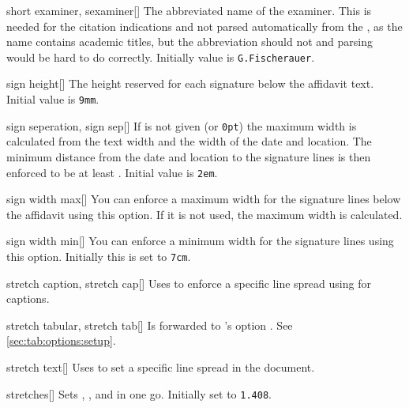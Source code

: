 \begin{describeopt}{short examiner, sexaminer}[]
  The abbreviated name of the examiner. This is needed for the citation
  indications and not parsed automatically from the , as the name
  contains academic titles, but the abbreviation should not and parsing would be
  hard to do correctly. Initially value is \texttt{G.\@ Fischerauer}.
\end{describeopt}
\begin{describeopt}{sign height}[]
  The height reserved for each signature below the affidavit text. Initial value
  is \texttt{9mm}.
\end{describeopt}
\begin{describeopt}{sign seperation, sign sep}[]
  If  is not given (or \texttt{0pt}) the maximum width is
  calculated from the text width and the width of the date and location. The
  minimum distance from the date and location to the signature lines is then
  enforced to be at least . Initial value is \texttt{2em}.
\end{describeopt}
\begin{describeopt}{sign width max}[]
  You can enforce a maximum width for the signature lines below the affidavit
  using this option. If it is not used, the maximum width is calculated.
\end{describeopt}
\begin{describeopt}{sign width min}[]
  You can enforce a minimum width for the signature lines using this option.
  Initially this is set to \texttt{7cm}.
\end{describeopt}
\begin{describeopt}{stretch caption, stretch cap}[]
  Uses  to enforce a specific line spread using 
  for captions.
\end{describeopt}
\begin{describeopt}{stretch tabular, stretch tab}[]
  Is forwarded to 's option . See
  \autoref{sec:tab:options:setup}.
\end{describeopt}
\begin{describeopt}{stretch text}[]
  Uses  to set a specific line spread in the document.
\end{describeopt}
\begin{describeopt}{stretches}[]
  Sets , , and  in one go.
  Initially set to \texttt{1.408}.
\end{describeopt}

